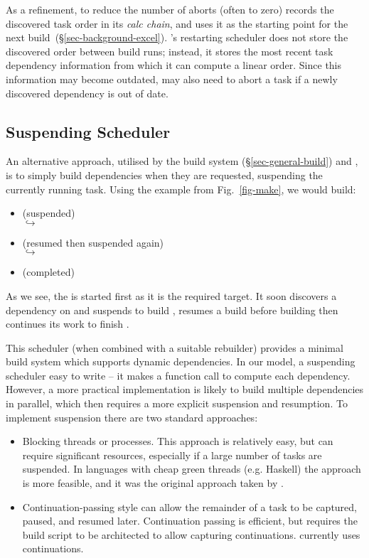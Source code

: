 As a refinement, to reduce the number of aborts (often to zero) \Excel records
the discovered task order in its \emph{calc chain}, and uses it as the starting
point for the next build~(\S\ref{sec-background-excel}). \Bazel's restarting
scheduler does not store the discovered order between build runs; instead, it
stores the most recent task dependency information from which it can compute a
linear order. Since this information may become outdated, \Bazel may also need
to abort a task if a newly discovered dependency is out of date.

\subsection{Suspending Scheduler}\label{sec-suspending}

An alternative approach, utilised by the  build system
(\S\ref{sec-general-build}) and \Shake, is to simply build dependencies when
they are requested, suspending the currently running task. Using the example
from Fig.~\ref{fig-make}, we would build:

\begin{itemize}
\item {} (suspended)\\
  $\hookrightarrow$ 
\item {} (resumed then suspended again)\\
  $\hookrightarrow$   
\item {} (completed)
\end{itemize}

\noindent
As we see, the  is started first as it is the required target. It
soon discovers a dependency on  and suspends to build ,
resumes a build before building  then continues its work to finish
.

This scheduler (when combined with a suitable rebuilder) provides a minimal
build system which supports dynamic dependencies. In our model, a suspending
scheduler easy to write -- it makes a function call to compute each dependency. However,
a more practical implementation is likely to build multiple dependencies in parallel,
which then requires a more explicit suspension and resumption. To implement
suspension there are two standard approaches:

\begin{itemize}
\item Blocking threads or processes. This approach is relatively easy, but can
require significant resources, especially if a large number of tasks are
suspended. In languages with cheap green threads (e.g. Haskell) the approach is
more feasible, and it was the original approach taken by \Shake.
\item Continuation-passing style \cite{claessen_continuations} can allow the
remainder of a task to be captured, paused, and resumed later. Continuation
passing is efficient, but requires the build script to be architected to allow
capturing continuations. \Shake currently uses continuations.
\end{itemize}

